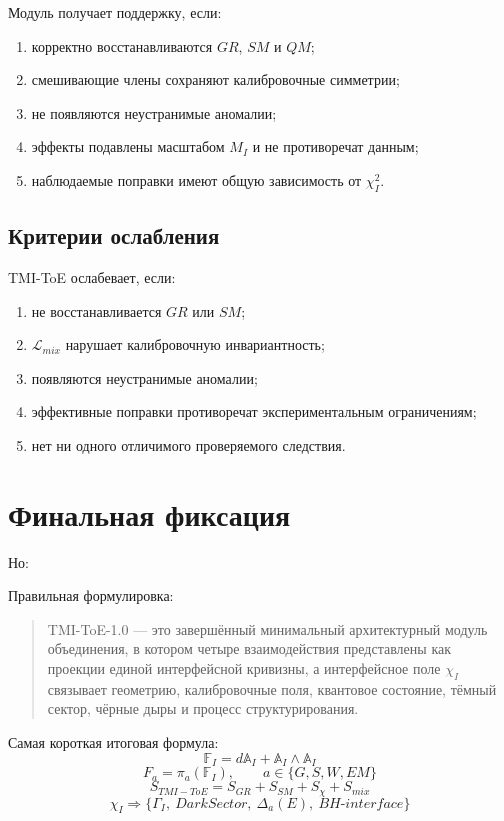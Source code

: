\documentclass[12pt,a4paper]{article}
\begin{document}
Модуль получает поддержку, если:
\begin{enumerate}
  \item корректно восстанавливаются $GR$, $SM$ и $QM$;
  \item смешивающие члены сохраняют калибровочные симметрии;
  \item не появляются неустранимые аномалии;
  \item эффекты подавлены масштабом $M_I$ и не противоречат данным;
  \item наблюдаемые поправки имеют общую зависимость от $\chi_I^2$.
\end{enumerate}

\subsection{Критерии ослабления}

TMI-ToE ослабевает, если:
\begin{enumerate}
  \item не восстанавливается $GR$ или $SM$;
  \item $\mathcal L_{mix}$ нарушает калибровочную инвариантность;
  \item появляются неустранимые аномалии;
  \item эффективные поправки противоречат экспериментальным ограничениям;
  \item нет ни одного отличимого проверяемого следствия.
\end{enumerate}

\section{Финальная фиксация}

\begin{center}
\end{center}

Но:
\begin{center}
\end{center}

Правильная формулировка:
\begin{quote}
TMI-ToE-1.0 — это завершённый минимальный архитектурный модуль объединения, в котором четыре взаимодействия представлены как проекции единой интерфейсной кривизны, а интерфейсное поле $\chi_I$ связывает геометрию, калибровочные поля, квантовое состояние, тёмный сектор, чёрные дыры и процесс структурирования.
\end{quote}

Самая короткая итоговая формула:
\[
\boxed{\mathbb F_I=d\mathbb A_I+\mathbb A_I\wedge\mathbb A_I}
\]
\[
\boxed{F_a=\pi_a(\mathbb F_I),\qquad a\in\{G,S,W,EM\}}
\]
\[
\boxed{S_{TMI-ToE}=S_{GR}+S_{SM}+S_\chi+S_{mix}}
\]
\[
\boxed{\chi_I\Rightarrow\{\Gamma_I,\ DarkSector,\ \Delta_a(E),\ BH\mbox{-}interface\}}
\]
\end{document}
